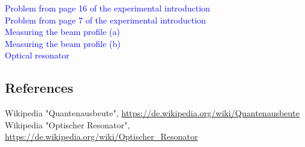 \documentclass{article}
\begin{document}
\textcolor{blue}{Problem from page 16 of the experimental introduction}\\



\textcolor{blue}{Problem from page 7 of the experimental introduction}\\



\textcolor{blue}{Measuring the beam profile (a)}\\

\textcolor{blue}{Measuring the beam profile (b)}\\


\textcolor{blue}{Optical resonator}\\


\subsection{References}

\begin{thebibliography}{9}
 Wikipedia "Quantenausbeute", \url{https://de.wikipedia.org/wiki/Quantenausbeute} 
 Wikipedia "Optischer Resonator", \url{https://de.wikipedia.org/wiki/Optischer_Resonator}
\end{thebibliography}
\end{document}
